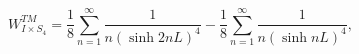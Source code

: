 \begin{equation}
W^{TM}_{I\times S_4}=\frac{1}{8}\sum^\infty_{n=1}\frac{1}{n(\sinh 2nL)^4}-
\frac{1}{8}\sum^\infty_{n=1}\frac{1}{n(\sinh nL)^4},
\end{equation}

